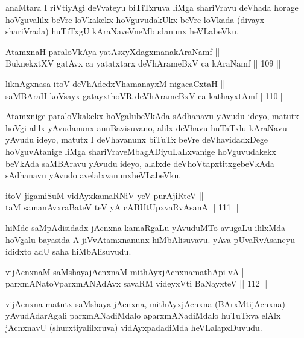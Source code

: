 \begin{artha}
anaMtara I riVtiyAgi deVvateyu biTiTxruva liMga shariVravu deVhada
horage hoVguvalilx beVre loVkakekx hoVguvudakUkx beVre loVkada (divayx
shariVrada) huTiTxgU kAraNaveVneMbudanunx heVLabeVku.
\end{artha}

\begin{shl}
AtamxnaH paraloVkAya yatAsxyXdagxmanakAraNamf ||  \\
BuknekxtXV gatAvx ca yatatxtarx deVhArameBxV ca kAraNamf \hfill || 109 ||  
\end{shl}

\begin{shl}
liknAgxnasa itoV deVhAdedxVhamanayxM nigacaCxtaH || \\
saMBAraH koV\s sayx gatayxthoVR deVhArameBxV ca kathayxtAmf \hfill ||110||  
\end{shl}

\begin{artha}
Atamxnige paraloVkakekx hoVgalubeVkAda sAdhanavu yAvudu ideyo, matutx
hoVgi alilx yAvudanunx anuBavisuvano, alilx deVhavu huTaTxlu kAraNavu
yAvudu ideyo, matutx I deVhavanunx biTuTx beVre deVhavidadxDege
hoVguvAtanige liMga shariVraveMbagADiyuLaLxvanige hoVguvudakekx
beVkAda saMBAravu yAvudu ideyo, alalxde deVhoVtapxtitxgebeVkAda
sAdhanavu yAvudo avelalxvanunx\break heVLabeVku.
\end{artha}


\begin{shl}
itoV jigamiSuM vidAyxkamaRNiV yeV purA\s jiRteV || \\
taM samanAvxraBateV teV yA cABUtUpxvaRvAsanA \hfill || 111 ||  
\end{shl}

\begin{artha}
hiMde saMpAdisidadx jAcnxna kamaRgaLu yAvuduMTo avugaLu ililxMda
hoVgalu bayasida A jiVvAtamxnanunx hiMbAlisuvavu. yAva pUvaRvAsaneyu
ididxto adU saha hiMbAlisuvudu.
\end{artha}

\begin{shl}
vijAcnxnaM saMshayajAcnxnaM mithAyxjAcnxnamathApi vA || \\
parxmANatoV\s parxmANAdAvx savaRM videyxVti BaNayxteV \hfill || 112 ||  
\end{shl}

\begin{artha}
vijAcnxna matutx saMshaya jAcnxna, mithAyxjAcnxna (BArxMtijAcnxna)
yAvudAdarAgali parxmANadiMdalo aparxmANadiMdalo huTuTxva elAlx
jAcnxnavU (shurxtiyalilxruva) vidAyxpadadiMda heVLalapxDuvudu.
\end{artha}

